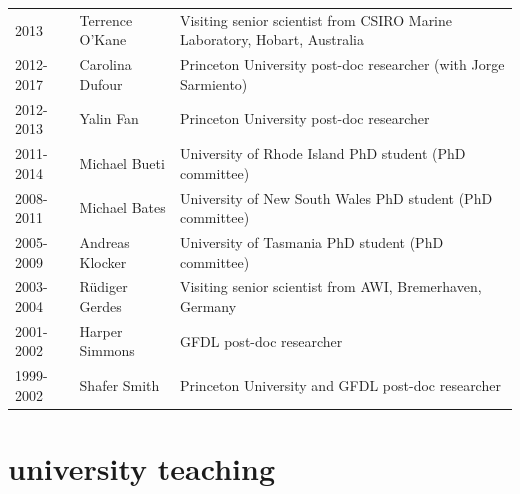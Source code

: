 \documentclass{article}
\begin{document}
\begin{tabular}{lll}
2013               & Terrence O'Kane   & Visiting senior scientist from CSIRO Marine Laboratory, Hobart, Australia \\

2012-2017     & Carolina Dufour   & Princeton University post-doc researcher (with Jorge Sarmiento)  \\

2012-2013     & Yalin Fan              & Princeton University post-doc researcher \\

2011-2014     & Michael Bueti       & University of Rhode Island  PhD student (PhD committee) \\

2008-2011     & Michael Bates       & University of New South Wales PhD student (PhD committee) \\

2005-2009     & Andreas Klocker   & University of Tasmania  PhD student (PhD committee) \\

2003-2004     & {R\"{u}diger} Gerdes  & Visiting senior scientist from AWI, Bremerhaven, Germany \\

2001-2002     & Harper Simmons   & GFDL post-doc researcher \\

1999-2002     & Shafer Smith         & Princeton University and GFDL post-doc researcher    
\end{tabular}

\section*{\sc  \color{Maroon}  university teaching}
\vspace{-.3cm}
\end{document}
